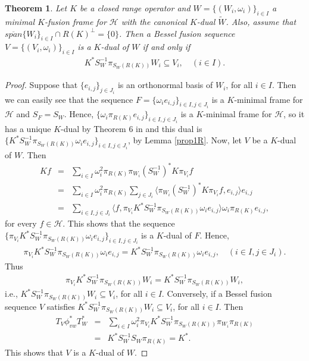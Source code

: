 \documentclass{birkjour}
\newtheorem{thm}{Theorem}[section]
\theoremstyle{definition}
\theoremstyle{remark}
\numberwithin{equation}{section}
\begin{document}
\begin{thm}\label{minimal dual}
Let $K$ be a closed range operator and $W = \lbrace (W_{i}, \omega_{i})\rbrace_{i\in I}$ a minimal $K$-fusion frame for $\mathcal{H}$  with the canonical $K$-dual $\widetilde{W}$. Also, assume that $\overline{span}\{W_{i}\}_{i\in I}\cap R(K)^{\perp}=\{0\}$.  Then a Bessel fusion sequence $V = \lbrace (V_{i}, \omega_{i})\rbrace_{i\in I}$ is a $K$-dual of $W$ if and only if
\begin{eqnarray*}
 K^{*}S_{W}^{-1}\pi_{S_{W}(R(K))}W_{i} \subseteq V_{i},\quad  (i\in I).
 \end{eqnarray*}
\end{thm}
\begin{proof}
Suppose that   $\{e_{i,j}\}_{j\in J_{i}}$ is an orthonormal basis of $W_{i}$, for all $i\in I$. Then we can easily see that  the sequence $F    = \{\omega_{i}e_{i,j}\}_{i\in I, j\in J_{i}}$ is a $K$-minimal frame for $\mathcal{H}$ and $S_{F} = S_{W}$. Hence,   $\{\omega_{i}\pi_{R(K)}e_{i,j}\}_{i\in I, j\in J_{i}}$ is a $K$-minimal frame for $\mathcal{H}$, so   it has a unique $K$-dual by Theorem 6 in \cite{arefi3} and this dual is  $\{K^{*}S_{W}^{-1}\pi_{S_{W}(R(K))}\omega_{i}e_{i,j}\}_{i\in I, j\in J_{i}}$, by Lemma \ref{prop1R}. 
 Now, let $V$ be  a $K$-dual of $W$. Then
 \begin{eqnarray*}
Kf &=& \sum_{i\in I}\omega_{i}^{2}\pi_{R(K)}\pi_{W_{i}}(S_{W}^{-1})^{*}K\pi_{V_{i}}f\\
&=& \sum_{i\in I}\omega_{i}^{2}\pi_{R(K)}\sum_{j\in J_{i}}\langle \pi_{W_{i}}(S_{W}^{-1})^{*}K\pi_{V_{i}}f, e_{i,j}\rangle e_{i,j}\\
&=& \sum_{i\in I, j\in J_{i}}\langle f, \pi_{V_{i}} K^{*}S_{W}^{-1}\pi_{S_{W}(R(K))}\omega_{i}e_{i,j}\rangle \omega_{i}\pi_{R(K)}e_{i,j},
 \end{eqnarray*}
for every $f\in \mathcal{H}$.
This shows that the sequence $\{\pi_{V_{i}} K^{*}S_{W}^{-1}\pi_{S_{W}(R(K))}\omega_{i}e_{i,j}\}_{i\in I, j\in J_{i}}$ is a $K$-dual of $F$. Hence,
\begin{eqnarray*}
  \pi_{V_{i}} K^{*}S_{W}^{-1}\pi_{S_{W}(R(K))}\omega_{i}e_{i,j} = K^{*}S_{W}^{-1}\pi_{S_{W}(R(K))}\omega_{i}e_{i,j}, \quad (i\in I,  j\in J_{i}).
\end{eqnarray*}
 Thus
\begin{eqnarray*}
\pi_{V_{i}} K^{*}S_{W}^{-1}\pi_{S_{W}(R(K))}W_{i} = K^{*}S_{W}^{-1}\pi_{S_{W}(R(K))}W_{i},
 \end{eqnarray*}
 i.e.,
$K^{*}S_{W}^{-1}\pi_{S_{W}(R(K))}W_{i}\subseteq V_{i}$, for all $i\in I$. Conversely, if  a Bessel fusion sequence $V$ satisfies $K^{*}S_{W}^{-1}\pi_{S_{W}(R(K))}W_{i} \subseteq V_{i}$, for all $i\in I$. Then
 \begin{eqnarray*}
T_{V}\phi_{vw}^{*}T_{W}^{*}&=&\sum_{i\in I}\omega_{i}^{2}\pi_{V_{i}}K^{*}S_{W}^{-1}\pi_{S_{W}(R(K))}\pi_{W_{i}}\pi_{R(K)} \\
&=& K^{*}S_{W}^{-1}S_{W}\pi_{R(K)} = K^{*}.
 \end{eqnarray*}
This shows that $V$ is a $K$-dual of $W$.
\end{proof}
\end{document}
